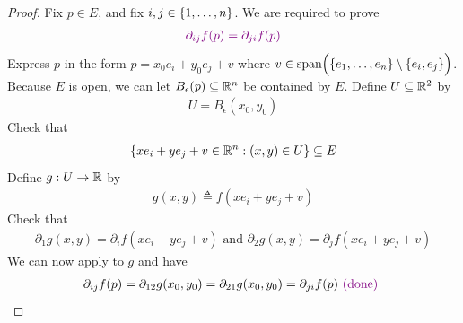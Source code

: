 \documentclass{report}
\begin{document}
\begin{proof}
Fix $p\in E$, and fix $i,j \in \{ 1,\dots ,n \}$. We are required to prove 
\begin{align*}
\textcolor{violet}{\partial_{ij}f(p)=\partial_{ji}f(p)}
\end{align*}
Express $p$ in the form  $p=x_0e_i+y_0e_j+v$ where $v\in\text{span}\Big(\{ e_1,\dots ,e_n \}\setminus \{ e_i,e_j \}\Big)$.\\

Because $E$ is open, we can let $B_\epsilon (p)\subseteq \mathbb{R}^n$ be contained by $E$. Define $U\subseteq \mathbb{R}^2$ by   
\begin{align*}
U= B_{\epsilon }(x_0,y_0)
\end{align*}
Check that 
\begin{align*}
\{ xe_i+ye_j+v \in\mathbb{R}^n :(x,y)\in U \}\subseteq E
\end{align*}
Define $g:U\rightarrow \mathbb{R}$ by 
\begin{align*}
g(x,y)\triangleq f(xe_i+ye_j+v)
\end{align*}
Check that 
\begin{align*}
\partial_1 g(x,y)=\partial_i f(xe_i+ye_j+v)\text{ and }\partial_2g(x,y)=\partial_j f(xe_i+ye_j+v)
\end{align*}
We can now apply  to $g$ and have 
 \begin{align*}
\partial_{ij}f(p)=\partial_{12}g(x_0,y_0)=\partial_{21}g(x_0,y_0)=\partial_{ji}f(p)\textcolor{violet}{\text{ (done) }}
\end{align*}
\end{proof}
\end{document}
